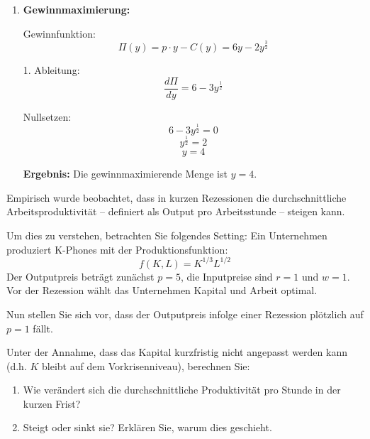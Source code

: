 \begin{solution}
\begin{enumerate}
		\item \textbf{Gewinnmaximierung:}

		      Gewinnfunktion:
		      \[
			      \Pi(y) = p \cdot y - C(y) = 6y - 2 y^{\frac{3}{2}}
		      \]

		      1. Ableitung:
		      \[
			      \frac{d \Pi}{dy} = 6 - 3 y^{\frac{1}{2}}
		      \]

		      Nullsetzen:
		      \[
			      6 - 3 y^{\frac{1}{2}} = 0
		      \]
		      \[
			      y^{\frac{1}{2}} = 2
		      \]
		      \[
			      y = 4
		      \]

		      \textbf{Ergebnis:} Die gewinnmaximierende Menge ist \( y = 4 \).

	\end{enumerate}

\end{solution}





\begin{question}
	Empirisch wurde beobachtet, dass in kurzen Rezessionen die durchschnittliche Arbeitsproduktivität – definiert als Output pro Arbeitsstunde – steigen kann.

	Um dies zu verstehen, betrachten Sie folgendes Setting:
	Ein Unternehmen produziert K-Phones mit der Produktionsfunktion:
	\[
		f(K, L) = K^{1/3} L^{1/2}
	\]
	Der Outputpreis beträgt zunächst \(p = 5\), die Inputpreise sind \(r = 1\) und \(w = 1\). Vor der Rezession wählt das Unternehmen Kapital und Arbeit optimal.

	Nun stellen Sie sich vor, dass der Outputpreis infolge einer Rezession plötzlich auf \(p = 1\) fällt.

	Unter der Annahme, dass das Kapital kurzfristig nicht angepasst werden kann (d.h. \(K\) bleibt auf dem Vorkrisenniveau), berechnen Sie:
	\begin{enumerate}
		\item Wie verändert sich die durchschnittliche Produktivität pro Stunde in der kurzen Frist?
		\item Steigt oder sinkt sie? Erklären Sie, warum dies geschieht.
	\end{enumerate}
\end{question}

